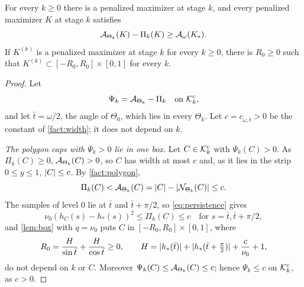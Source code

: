 \begin{proposition}\label{prop:penmax}
For every $k\ge0$ there is a penalized maximizer at stage $k$, and every
penalized maximizer $K$ at stage $k$ satisfies
\[
  \mathcal{A}_{\Theta_k}(K)-\Pi_k(K)\ge\mathcal{A}_\omega(K_*).
\]
If $K^{(k)}$ is a penalized maximizer at stage $k$ for every $k\ge0$, there is
$R_0\ge0$ such that $K^{(k)}\subset[-R_0,R_0]\times[0,1]$ for every $k$.
\end{proposition}

\begin{proof}
Let
\[
  \Psi_k=\mathcal{A}_{\Theta_k}-\Pi_k\quad\text{on }\mathcal{K}^{\mathrm{c}}_k,
\]
and let $\bar t=\omega/2$, the angle of $\Theta_0$, which lies in every
$\Theta_k$. Let $c=c_{\omega,\bar t}>0$ be the constant of \cref{fact:width}; it
does not depend on $k$.

\emph{The polygon caps with $\Psi_k>0$ lie in one box.} Let $C\in\mathcal{K}^{\mathrm{c}}_k$ with
$\Psi_k(C)>0$. As $\Pi_k(C)\ge0$, $\mathcal{A}_{\Theta_k}(C)>0$, so $C$ has width at
most $c$ and, as it lies in the strip $0\le y\le1$, $\lvert C\rvert\le c$. By
\cref{fact:polygon},
\[
  \Pi_k(C)<\mathcal{A}_{\Theta_k}(C)=\lvert C\rvert-\lvert \mathcal{N}_{\Theta_k}(C)\rvert\le c.
\]
The samples of level $0$ lie at $\bar t$ and $\bar t+\pi/2$, so
\eqref{eq:persistence} gives
\[
  \nu_0(h_C(s)-h_*(s))^2\le\Pi_k(C)\le c\quad\text{for }s=\bar t,\bar t+\pi/2,
\]
and \cref{lem:box} with $q=\nu_0$ puts $C$ in $[-R_0,R_0]\times[0,1]$, where
\[
  R_0=\frac H{\sin\bar t}+\frac H{\cos\bar t}\ge0,\qquad H=\lvert h_*(\bar t)\rvert
    +\lvert h_*(\bar t+\tfrac\pi2)\rvert+\frac c{\nu_0}+1,
\]
do not depend on $k$ or $C$. Moreover $\Psi_k(C)\le\mathcal{A}_{\Theta_k}(C)\le c$;
hence $\Psi_k\le c$ on $\mathcal{K}^{\mathrm{c}}_k$, as $c>0$.


\end{proof}
